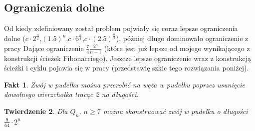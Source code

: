 \documentclass{pracamgr}
\newtheorem{theorem}{Twierdzenie}
\newtheorem{fact}[theorem]{Fakt}
\begin{document}
    \subsection{Ograniczenia dolne}
     Od kiedy zdefiniowany został problem pojwiały się coraz lepsze ograniczenia dolne
     ($c\cdot2^{\frac{n}{2}}$,$(1.5)^{n}$,$c\cdot6^{\frac{n}{4}}$,$c\cdot(2.5)^{\frac{n}{2}}$), później długo dominowało ograniczenie z pracy \cite{Snake1}
     Dające ograniczenie $\frac{7}{4}\frac{2^n}{n-1}$ (które jest już lepsze od mojego wynikającego z konstrukcji ścieżek Fibonacciego).\newline
     Jeszcze lepsze ograniczenie wraz z konstrukcją ścieżki i cyklu pojawia się w pracy \cite{Snake2} (przedstawię szkic tego rozwiązania poniżej).
     \begin{fact}
      Zwój w pudełku można przerobić na węża w pudełku poprzez usunięcie dowolnego wierzchołka tracąc 2 na długości.
     \end{fact}
     \begin{theorem}\label{snake 9/64 2^n}
      Dla $Q_n$, $n\ge7$ można skonstruować zwój w pudełku o długości $\frac{9}{64}\cdot2^n$
     \end{theorem}
\end{document}
